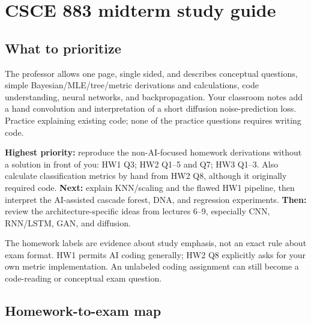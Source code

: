 \documentclass[11pt]{article}
\begin{document}
\section*{CSCE 883 midterm study guide}

\subsection*{What to prioritize}

The professor allows one page, single sided, and describes conceptual questions, simple Bayesian/\allowbreak{}MLE/\allowbreak{}tree/\allowbreak{}metric derivations and calculations, code understanding, neural networks, and backpropagation. Your classroom notes add a hand convolution and interpretation of a short diffusion noise-prediction loss. Practice explaining existing code; none of the practice questions requires writing code.

\textbf{Highest priority:} reproduce the non-AI-focused homework derivations without a solution in front of you: HW1 Q3; HW2 Q1–5 and Q7; HW3 Q1–3. Also calculate classification metrics by hand from HW2 Q8, although it originally required code. \textbf{Next:} explain KNN/\allowbreak{}scaling and the flawed HW1 pipeline, then interpret the AI-assisted cascade forest, DNA, and regression experiments. \textbf{Then:} review the architecture-specific ideas from lectures 6–9, especially CNN, RNN/\allowbreak{}LSTM, GAN, and diffusion.

The homework labels are evidence about study emphasis, not an exact rule about exam format. HW1 permits AI coding generally; HW2 Q8 explicitly asks for your own metric implementation. An unlabeled coding assignment can still become a code-reading or conceptual exam question.

\subsection*{Homework-to-exam map}
\end{document}
